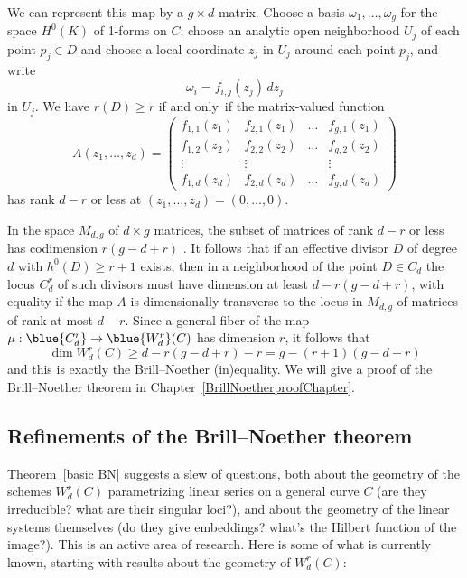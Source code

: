 We can represent this map by a $g \times d$ matrix. Choose a basis
$\omega_1,\dots,\omega_g$ for the space $H^0(K)$ of 1-forms on $C$;
choose an analytic open neighborhood $U_j$ of each point $p_j \in D$
and choose a local coordinate $z_j$ in $U_j$ around each point $p_j$,
and write
$$
\omega_i = f_{i,j}(z_j)\,dz_j
$$
in $U_j$. We  have $r(D) \geq r$ if and only~if the  matrix-valued
function
$$
A(z_1,\dots,z_d) =
\begin{pmatrix}
f_{1,1}(z_1) & f_{2,1}(z_1) & \dots & f_{g,1}(z_1) \\
f_{1,2}(z_2) & f_{2,2}(z_2) & \dots & f_{g,2}(z_2) \\
\vdots & \vdots &  & \vdots \\
f_{1,d}(z_d) & f_{2,d}(z_d) & \dots & f_{g,d} (z_d)
\end{pmatrix}
$$
has rank $d-r$ or less at $(z_1,\dots,z_d) = (0,\dots,0)$.


In the space $M_{d,g}$ of $d \times g$ matrices, the subset of matrices
of rank $d-r$ or less has codimension $r(g-d+r)$ 
\cite[Exercise 10.9]{Eisenbud1995}.
It follows
that if  an effective divisor $D$ of degree $d$ with $h^0(D) \geq r+1$
exists, then in a neighborhood of the point $D \in C_d$ the locus
$C^r_d$ of such divisors must have dimension at least $d - r(g-d+r)$,
with equality if the map $A$ is dimensionally transverse to the locus
in $M_{d,g}$ of matrices of rank at most $d-r$. Since a general fiber
%
%
of the map $\mu : 
\blue{C^r_d}
 \to 
\blue{W^r_d}
(C)$ has dimension $r$, it follows that
$$
\dim W^r_d(C) \geq d - r(g-d+r) - r = g - (r+1)(g-d+r)
$$
and this is exactly the  Brill--Noether (in)equality. We will give a proof
of the Brill--Noether theorem in Chapter~\ref{BrillNoetherproofChapter}.


\subsection{Refinements of the Brill--Noether theorem}

Theorem~\ref{basic BN} suggests a slew of questions, both about the
geometry of the schemes $W^r_d(C)$ parametrizing linear series on a
general curve $C$ (are they irreducible? what are their singular
loci?), and about the geometry of the linear systems themselves (do
they give embeddings? what's the Hilbert function of the image?). This
is an active area of research. Here is some of what is currently
known, starting with results about the geometry of $W^r_d(C)$:


